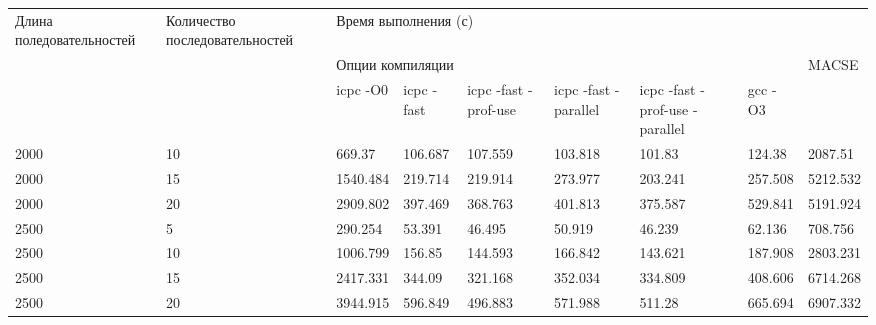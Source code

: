 \begin{landscape}
\begin{table}
\caption*{Таблица 2: Результаты тестирования}
\begin{longtable}{|*{2}{p{3.5cm}|}*{2}{p{1.8cm}|}*{3}{p{2.8cm}|}*{2}{p{1.8cm}|}}
\hline
\multicolumn{ 1}{|p{3.5cm}|}{Длина поледовательностей} & \multicolumn{ 1}{p{3.5cm}|}{Количество последовательностей} & \multicolumn{ 7}{p{15.6cm}|}{Время выполнения (с)} \\ \cline{ 3- 9}
\multicolumn{ 1}{|p{3.5cm}|}{} & \multicolumn{ 1}{p{3.5cm}|}{} & \multicolumn{ 6}{p{10.8cm}|}{Опции компиляции } & \multicolumn{ 1}{p{1.8cm}|}{MACSE} \\ \cline{ 3- 8}
\multicolumn{ 1}{|p{3.5cm}|}{} & \multicolumn{ 1}{p{3.5cm}|}{} & \multicolumn{1}{p{1.8cm}|}{icpc -O0} & \multicolumn{1}{p{1.8cm}|}{icpc -fast} & \multicolumn{1}{p{1.8cm}|}{icpc  -fast -prof-use} & \multicolumn{1}{p{1.8cm}|}{icpc -fast -parallel} & \multicolumn{1}{p{1.8cm}|}{icpc -fast -prof-use -parallel} & \multicolumn{1}{p{1.8cm}|}{gcc -O3} & \multicolumn{ 1}{p{1.8cm}|}{} \\ \hline
2000 & 10 & 669.37 & 106.687 & 107.559 & 103.818 & 101.83 & 124.38 & 2087.51 \\ \hline
2000 & 15 & 1540.484 & 219.714 & 219.914 & 273.977 & 203.241 & 257.508 & 5212.532 \\ \hline
2000 & 20 & 2909.802 & 397.469 & 368.763 & 401.813 & 375.587 & 529.841 & 5191.924 \\ \hline
2500 & 5 & 290.254 & 53.391 & 46.495 & 50.919 & 46.239 & 62.136 & 708.756 \\ \hline
2500 & 10 & 1006.799 & 156.85 & 144.593 & 166.842 & 143.621 & 187.908 & 2803.231 \\ \hline
2500 & 15 & 2417.331 & 344.09 & 321.168 & 352.034 & 334.809 & 408.606 & 6714.268 \\ \hline
2500 & 20 & 3944.915 & 596.849 & 496.883 & 571.988 & 511.28 & 665.694 & 6907.332 \\ \hline
\end{longtable}
\end{table}
\end{landscape}